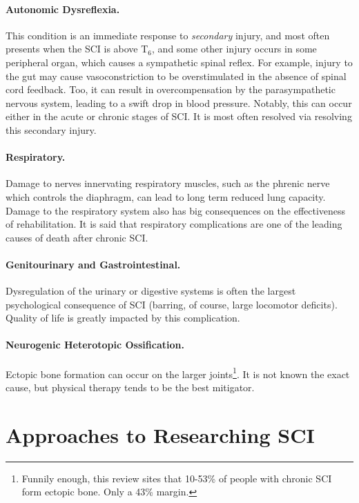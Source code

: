 \subsubsection{Autonomic Dysreflexia.}
This condition is an immediate response to \textit{secondary} injury, and most often presents when the SCI is above T$_6$, and some other injury occurs in some peripheral organ, which causes a sympathetic spinal reflex. For example, injury to the gut may cause vasoconstriction to be overstimulated in the absence of spinal cord feedback. Too, it can result in overcompensation by the parasympathetic nervous system, leading to a swift drop in blood pressure. Notably, this can occur either in the acute or chronic stages of SCI. It is most often resolved via resolving this secondary injury. 

\subsubsection{Respiratory.}
Damage to nerves innervating respiratory muscles, such as the phrenic nerve which controls the diaphragm, can lead to long term reduced lung capacity. Damage to the respiratory system also has big consequences on the effectiveness of rehabilitation. It is said that respiratory complications are one of the leading causes of death after chronic SCI.

\subsubsection{Genitourinary and Gastrointestinal.}
Dysregulation of the urinary or digestive systems is often the largest psychological consequence of SCI (barring, of course, large locomotor deficits). Quality of life is greatly impacted by this complication. 

\subsubsection{Neurogenic Heterotopic Ossification.}
Ectopic bone formation can occur on the larger joints\footnote{Funnily enough, this review sites that 10-53\% of people with chronic SCI form ectopic bone. Only a 43\% margin.}. It is not known the exact cause, but physical therapy tends to be the best mitigator. 




\chapter{Approaches to Researching SCI}

